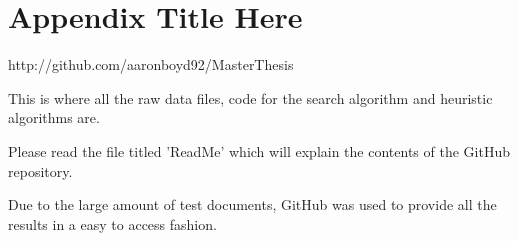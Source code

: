 
\chapter{Appendix Title Here} %

\label{AppendixA}
http://github.com/aaronboyd92/MasterThesis

This is where all the raw data files, code for the search algorithm and heuristic algorithms are.

Please read the file titled 'ReadMe' which will explain the contents of the GitHub repository.

Due to the large amount of test documents, GitHub was used to provide all the results in a easy to access fashion. 